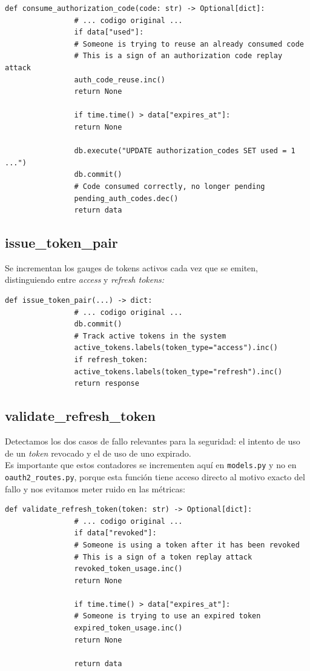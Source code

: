 \documentclass[12pt, a4paper]{article}
\begin{document}
			\begin{lstlisting}[style=python, caption=Instrumentación de consume\_authorization\_code]
				def consume_authorization_code(code: str) -> Optional[dict]:
				# ... codigo original ...
				if data["used"]:
				# Someone is trying to reuse an already consumed code
				# This is a sign of an authorization code replay attack
				auth_code_reuse.inc()
				return None
				
				if time.time() > data["expires_at"]:
				return None
				
				db.execute("UPDATE authorization_codes SET used = 1 ...")
				db.commit()
				# Code consumed correctly, no longer pending
				pending_auth_codes.dec()
				return data
			\end{lstlisting}
			
		\subsection{issue\_token\_pair}
		
			Se incrementan los gauges de tokens activos cada vez que se emiten, distinguiendo entre \textit{access }y \textit{refresh tokens:}
			
			\begin{lstlisting}[style=python, caption=Instrumentación de issue\_token\_pair]
				def issue_token_pair(...) -> dict:
				# ... codigo original ...
				db.commit()
				# Track active tokens in the system
				active_tokens.labels(token_type="access").inc()
				if refresh_token:
				active_tokens.labels(token_type="refresh").inc()
				return response
			\end{lstlisting}
			
		\subsection{validate\_refresh\_token}
		
			Detectamos los dos casos de fallo relevantes para la seguridad: el intento de uso de un \textit{token} revocado y el de uso de uno expirado.\\ Es importante que estos contadores se incrementen aquí en \texttt{models.py} y no en \texttt{oauth2\_routes.py}, porque esta función tiene acceso directo al motivo exacto del fallo y nos evitamos meter ruido en las métricas:
			
			\begin{lstlisting}[style=python, caption=Instrumentación de validate\_refresh\_token]
				def validate_refresh_token(token: str) -> Optional[dict]:
				# ... codigo original ...
				if data["revoked"]:
				# Someone is using a token after it has been revoked
				# This is a sign of a token replay attack
				revoked_token_usage.inc()
				return None
				
				if time.time() > data["expires_at"]:
				# Someone is trying to use an expired token
				expired_token_usage.inc()
				return None
				
				return data
			\end{lstlisting}
		
\end{document}

